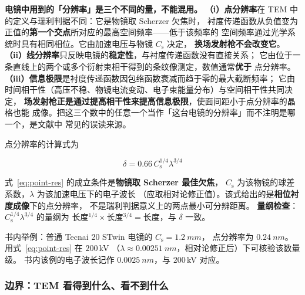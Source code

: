 \begin{pitfall}
\textbf{电镜中用到的「分辨率」是三个不同的量，不能混用。}
\textbf{（i）点分辨率}在 TEM 中的定义与瑞利判据不同：它是物镜取 Scherzer 欠焦时，
衬度传递函数从负值变为正值的\textbf{第一个交点}所对应的最高空间频率——低于该频率的
空间频率通过光学系统时具有相同相位。它由加速电压与物镜 $C_{\mathrm{s}}$ 决定，
\textbf{换场发射枪不会改变它}。
\textbf{（ii）线分辨率}只反映电镜的\textbf{稳定性}，与衬度传递函数没有直接关系；
它由位于一条直线上的两个或多个衍射束相干得到的条纹像测定，数值通常\textbf{优于}
点分辨率。
\textbf{（iii）信息极限}是衬度传递函数因包络函数衰减而趋于零的最大截断频率；
它由时间相干性（高压不稳、物镜电流变动、电子束能量分布）与空间相干性共同决定，
\textbf{场发射枪正是通过提高相干性来提高信息极限}，使面间距小于点分辨率的晶格也能
成像。把这三个数中的任意一个当作「这台电镜的分辨率」而不注明是哪一个，是文献中
常见的误读来源。
\end{pitfall}

点分辨率的计算式为

\begin{equation}\label{eq:point-res}
\delta=0.66\,C_{\mathrm{s}}^{1/4}\lambda^{3/4}
\end{equation}

\begin{keycond}
式~\eqref{eq:point-res} 的成立条件是\textbf{物镜取 Scherzer 最佳欠焦}，
$C_{\mathrm{s}}$ 为该物镜的球差系数，$\lambda$ 为该加速电压下的电子波长
（应取相对论修正值）。该式给出的是\textbf{相位衬度成像}下的点分辨率，
不是瑞利判据意义上的两点最小可分辨距离。
\textbf{量纲检查}：$C_{\mathrm{s}}^{1/4}\lambda^{3/4}$ 的量纲为
长度$^{1/4}\times$长度$^{3/4}=$长度，与 $\delta$ 一致。
\end{keycond}

书内举例：普通 Tecnai 20 STwin 电镜的 $C_{\mathrm{s}}=\qty{1.2}{mm}$，
点分辨率为 $\qty{0.24}{nm}$。用式~\eqref{eq:point-res} 在 $200$\,kV
（$\lambda\approx\qty{0.00251}{nm}$，相对论修正后）下可核验该数量级。
书内该例的电子波长记作 $\qty{0.0025}{nm}$，与 $200$\,kV 对应。

\subsubsection{边界：TEM 看得到什么、看不到什么}

